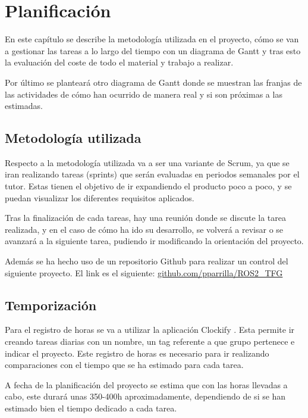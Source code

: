 \chapter{Planificación}

En este capítulo se describe la metodología utilizada en el proyecto, cómo se van a gestionar las tareas a lo largo del tiempo con un diagrama de Gantt y tras esto la evaluación del coste de todo el material y trabajo a realizar.

Por último se planteará otro diagrama de Gantt donde se muestran las franjas de las actividades de cómo han ocurrido de manera real y si son próximas a las estimadas.

\section{Metodología utilizada}

Respecto a la metodología utilizada va a ser una variante de Scrum, ya que se iran  realizando tareas (sprints) que serán evaluadas en periodos semanales por el tutor. Estas tienen el objetivo de ir expandiendo el producto poco a poco, y se puedan visualizar los diferentes requisitos aplicados. 

Tras la finalización de cada tareas, hay una reunión donde se discute la tarea realizada, y en el caso de cómo ha ido su desarrollo, se volverá a revisar o se avanzará a la siguiente tarea, pudiendo ir modificando la orientación del proyecto.

Además se ha hecho uso de un repositorio Github para realizar un control del siguiente proyecto. El link es el siguiente: \href{https://github.com/pparrilla/ROS2_TFG}{github.com/pparrilla/ROS2\_TFG}

\section{Temporización}

Para el registro de horas se va a utilizar la aplicación Clockify \cite{clockify}. Esta permite ir creando tareas diarias con un nombre, un tag referente a que grupo pertenece e indicar el proyecto. Este registro de horas es necesario para ir realizando comparaciones con el tiempo que se ha estimado para cada tarea.

A fecha de la planificación del proyecto se estima que con las horas llevadas a cabo, este durará unas 350-400h aproximadamente, dependiendo de si se han estimado bien el tiempo dedicado a cada tarea.

